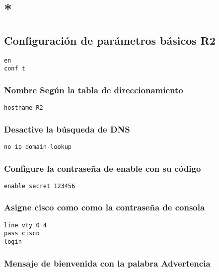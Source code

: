 \documentclass[twocolumn]{article}
\begin{document}
\section*{*}


\subsection*{Configuración de parámetros básicos R2}

\begin{verbatim}
en
conf t
\end{verbatim}

\subsubsection*{Nombre Según la tabla de direccionamiento}

\begin{verbatim}
hostname R2
\end{verbatim}

\subsubsection*{Desactive la búsqueda de DNS}

\begin{verbatim}
no ip domain-lookup
\end{verbatim}

\subsubsection*{Configure la contraseña de enable con su código}

\begin{verbatim}
enable secret 123456
\end{verbatim}

\subsubsection*{Asigne cisco como como la contraseña de consola}

\begin{verbatim}
line vty 0 4
pass cisco
login
\end{verbatim}

\subsubsection*{Mensaje de bienvenida con la palabra Advertencia}
\end{document}

